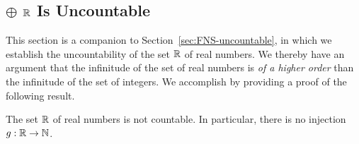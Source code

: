 \subsection{$\oplus$ $\mathbb{R}$ Is Uncountable}
\label{sec:R-uncountable}
\label{sec:Reals-uncountable}

This section is a companion to Section~\ref{sec:FNS-uncountable}, in
which we establish the uncountability of the set $\mathbb{R}$ of real numbers.  We thereby
have an argument that the infinitude of the set of real numbers is
{\em of a higher order} than the infinitude of the set of integers.
We accomplish by providing a proof of the following result.

\begin{prop}
\label{thm:R-uncountable}
The set $\mathbb{R}$ of real numbers is not countable.  In particular, there
is no injection $g: \mathbb{R} \rightarrow \mathbb{N}$.
\end{prop}

